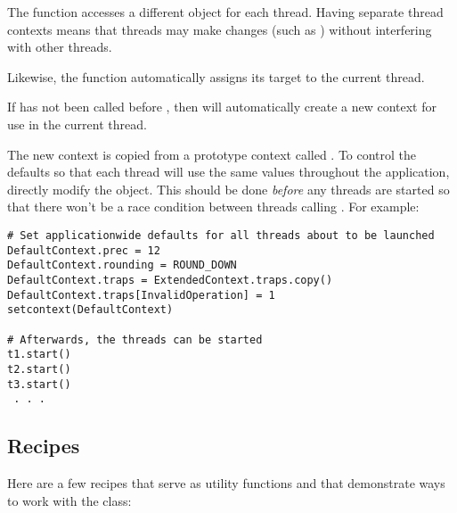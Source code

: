The  function accesses a different 
object for each thread.  Having separate thread contexts means that threads
may make changes (such as ) without interfering with
other threads.

Likewise, the  function automatically assigns its target
to the current thread.

If  has not been called before ,
then  will automatically create a new context for use
in the current thread.

The new context is copied from a prototype context called
. To control the defaults so that each thread will use the
same values throughout the application, directly modify the
 object. This should be done \emph{before} any threads are
started so that there won't be a race condition between threads calling
. For example:

\begin{verbatim}
# Set applicationwide defaults for all threads about to be launched
DefaultContext.prec = 12
DefaultContext.rounding = ROUND_DOWN
DefaultContext.traps = ExtendedContext.traps.copy()
DefaultContext.traps[InvalidOperation] = 1
setcontext(DefaultContext)

# Afterwards, the threads can be started
t1.start()
t2.start()
t3.start()
 . . .
\end{verbatim}



\subsection{Recipes \label{decimal-recipes}}

Here are a few recipes that serve as utility functions and that demonstrate
ways to work with the  class:

